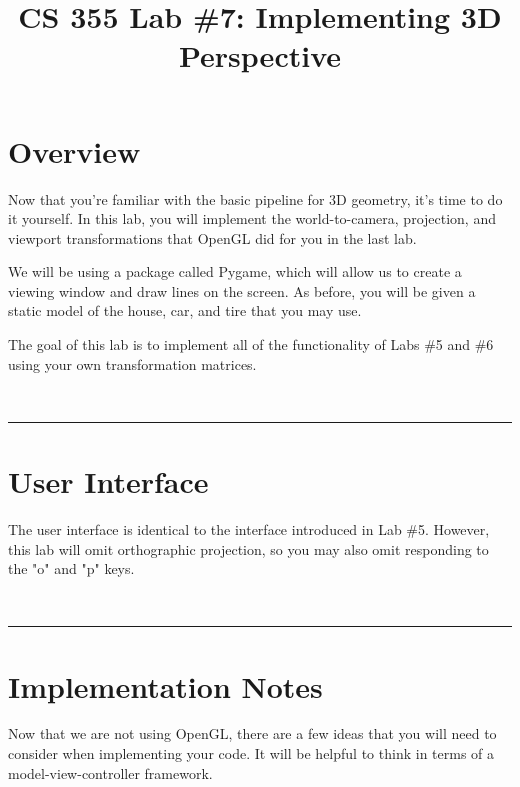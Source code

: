 \documentclass[11pt]{article}
\title{\vspace{-0.5in}CS 355 Lab \#7: Implementing 3D Perspective}
\date{\vspace{-0.25in}}
\newif\ifinstructor
\begin{document}
\maketitle

\newcommand{\mat}[1]{\mathbf #1}
\renewcommand{\vec}[1]{\mathbf #1}
\newcommand{\x}{\vec{x}}
\newcommand{\y}{\vec{y}}
\newcommand{\p}{\vec{p}}
\renewcommand{\c}{\vec{c}}

\newcommand{\note}[1]{\textcolor{red}{NOTE: #1}}
\newcommand{\divider}{\bigskip ~ \hrule}

\vspace{-0.5in}

\ifinstructor
Time to complete: 1 week ramp-up plus 1 week to actually do.
\fi

\section*{Overview}

Now that you're familiar with the basic pipeline for 3D geometry, it's time to do it yourself. In this lab, you will implement the world-to-camera, projection, and viewport transformations that OpenGL did for you in the last lab.

We will be using a package called Pygame, which will allow us to create a viewing window and draw lines on the screen. As before, you will be given a static model of the house, car, and tire that you may use.

The goal of this lab is to implement all of the functionality of Labs \#5 and \#6 using your own transformation matrices.

\divider

\section*{User Interface}

The user interface is identical to the interface introduced in Lab \#5. However, this lab will omit orthographic projection, so you may also omit responding to the "o" and "p" keys.

\divider

\section*{Implementation Notes}

Now that we are not using OpenGL, there are a few ideas that you will need to consider when implementing your code. It will be helpful to think in terms of a model-view-controller framework.
\end{document}

